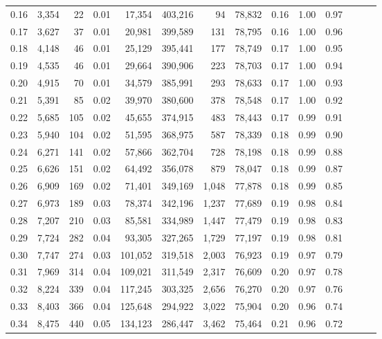 \begin{tabular}{rrrrrrrrrrrrrr}
0.16 &  3,354 &     22 &  0.01 &   17,354 &  403,216 &      94 &  78,832 &  0.16 &  1.00 &      0.97 \\
0.17 &  3,627 &     37 &  0.01 &   20,981 &  399,589 &     131 &  78,795 &  0.16 &  1.00 &      0.96 \\
0.18 &  4,148 &     46 &  0.01 &   25,129 &  395,441 &     177 &  78,749 &  0.17 &  1.00 &      0.95 \\
0.19 &  4,535 &     46 &  0.01 &   29,664 &  390,906 &     223 &  78,703 &  0.17 &  1.00 &      0.94 \\
0.20 &  4,915 &     70 &  0.01 &   34,579 &  385,991 &     293 &  78,633 &  0.17 &  1.00 &      0.93 \\
0.21 &  5,391 &     85 &  0.02 &   39,970 &  380,600 &     378 &  78,548 &  0.17 &  1.00 &      0.92 \\
0.22 &  5,685 &    105 &  0.02 &   45,655 &  374,915 &     483 &  78,443 &  0.17 &  0.99 &      0.91 \\
0.23 &  5,940 &    104 &  0.02 &   51,595 &  368,975 &     587 &  78,339 &  0.18 &  0.99 &      0.90 \\
0.24 &  6,271 &    141 &  0.02 &   57,866 &  362,704 &     728 &  78,198 &  0.18 &  0.99 &      0.88 \\
0.25 &  6,626 &    151 &  0.02 &   64,492 &  356,078 &     879 &  78,047 &  0.18 &  0.99 &      0.87 \\
0.26 &  6,909 &    169 &  0.02 &   71,401 &  349,169 &   1,048 &  77,878 &  0.18 &  0.99 &      0.85 \\
0.27 &  6,973 &    189 &  0.03 &   78,374 &  342,196 &   1,237 &  77,689 &  0.19 &  0.98 &      0.84 \\
0.28 &  7,207 &    210 &  0.03 &   85,581 &  334,989 &   1,447 &  77,479 &  0.19 &  0.98 &      0.83 \\
0.29 &  7,724 &    282 &  0.04 &   93,305 &  327,265 &   1,729 &  77,197 &  0.19 &  0.98 &      0.81 \\
0.30 &  7,747 &    274 &  0.03 &  101,052 &  319,518 &   2,003 &  76,923 &  0.19 &  0.97 &      0.79 \\
0.31 &  7,969 &    314 &  0.04 &  109,021 &  311,549 &   2,317 &  76,609 &  0.20 &  0.97 &      0.78 \\
0.32 &  8,224 &    339 &  0.04 &  117,245 &  303,325 &   2,656 &  76,270 &  0.20 &  0.97 &      0.76 \\
0.33 &  8,403 &    366 &  0.04 &  125,648 &  294,922 &   3,022 &  75,904 &  0.20 &  0.96 &      0.74 \\
0.34 &  8,475 &    440 &  0.05 &  134,123 &  286,447 &   3,462 &  75,464 &  0.21 &  0.96 &      0.72 \\

\end{tabular}
